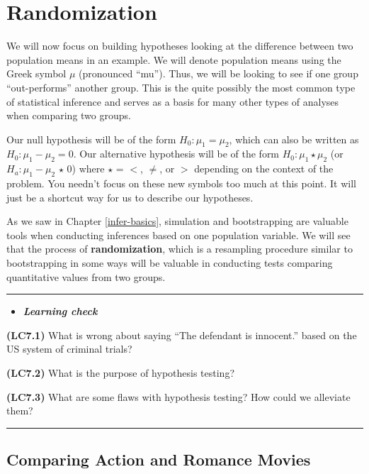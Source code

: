 \documentclass[]{tufte-book}
\let\oldrule=\rule
\renewcommand{\rule}[1]{\oldrule{\linewidth}}
\newenvironment{rmdblock}[1]
  {\begin{shaded*}
  \begin{itemize}
  \renewcommand{\labelitemi}{
    \raisebox{-.7\height}[0pt][0pt]{
    }
  }
  \item
  }
  {
  \end{itemize}
  \end{shaded*}
  }
\newenvironment{learncheck}
  {\begin{rmdblock}{warning}}
  {\end{rmdblock}}
\begin{document}
\section{Randomization}\label{randomization}

We will now focus on building hypotheses looking at the difference
between two population means in an example. We will denote population
means using the Greek symbol \(\mu\) (pronounced ``mu''). Thus, we will
be looking to see if one group ``out-performs'' another group. This is
the quite possibly the most common type of statistical inference and
serves as a basis for many other types of analyses when comparing two
groups.

Our null hypothesis will be of the form \(H_0: \mu_1 = \mu_2\), which
can also be written as \(H_0: \mu_1 - \mu_2 = 0\). Our alternative
hypothesis will be of the form \(H_0: \mu_1 \star \mu_2\) (or
\(H_a: \mu_1 - \mu_2 \, \star \, 0\)) where \(\star\) = \(<\), \(\ne\),
or \(>\) depending on the context of the problem. You needn't focus on
these new symbols too much at this point. It will just be a shortcut way
for us to describe our hypotheses.

As we saw in Chapter \ref{infer-basics}, simulation and bootstrapping
are valuable tools when conducting inferences based on one population
variable. We will see that the process of \textbf{randomization}, which
is a resampling procedure similar to bootstrapping in some ways will be
valuable in conducting tests comparing quantitative values from two
groups.

\begin{center}\rule{0.5\linewidth}{\linethickness}\end{center}

\begin{learncheck}
\textbf{\emph{Learning check}}
\end{learncheck}

\textbf{(LC7.1)} What is wrong about saying ``The defendant is
innocent.'' based on the US system of criminal trials?

\textbf{(LC7.2)} What is the purpose of hypothesis testing?

\textbf{(LC7.3)} What are some flaws with hypothesis testing? How could
we alleviate them?

\begin{center}\rule{0.5\linewidth}{\linethickness}\end{center}

\subsection{Comparing Action and Romance
Movies}\label{comparing-action-and-romance-movies}
\end{document}

